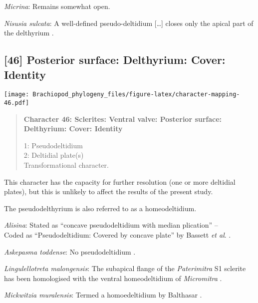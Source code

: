 \documentclass[openany]{book}
\theoremstyle{definition}
\theoremstyle{definition}
\theoremstyle{definition}
\theoremstyle{remark}
\begin{document}
\hypertarget{Micrina-coding-45}{}
\emph{Micrina}: Remains somewhat open.

\hypertarget{Nisusia_sulcata-coding-45}{}
\emph{Nisusia sulcata}: A well-defined pseudo-deltidium {[}\ldots{}{]}
closes only the apical part of\\
the delthyrium \citep{Rowell1985Theevolutionary}.

\subsection*{{[}46{]} Posterior surface: Delthyrium: Cover:
Identity}\label{posterior-surface-delthyrium-cover-identity}

\texttt{[image: Brachiopod\_phylogeny\_files/figure-latex/character-mapping-46.pdf]}

\begin{quote}
\textbf{Character 46: Sclerites: Ventral valve: Posterior surface:
Delthyrium: Cover: Identity}

1: Pseudodeltidium\\
2: Deltidial plate(s)\\
Transformational character.
\end{quote}

This character has the capacity for further resolution (one or more
deltidial plates), but this is unlikely to affect the results of the
present study.

The pseudodelthyrium is also referred to as a homeodeltidium.

\hypertarget{Alisina-coding-46}{}
\emph{Alisina}: Stated as ``concave pseudodeltidium with median
plication'' -- \citet{Williams2000LinguliformeaCraniiformea}\\
Coded as ``Pseudodeltidium: Covered by concave plate'' by Bassett
\emph{et al}. \citeyearpar{Bassett2001Functionalmorphology}.

\hypertarget{Askepasma_toddense-coding-46}{}
\emph{Askepasma toddense}: No pseudodeltidium
\citep[p.~153]{Williams2000LinguliformeaCraniiformea}.

\hypertarget{Lingulellotreta_malongensis-coding-46}{}
\emph{Lingulellotreta malongensis}: The subapical flange of the
\emph{Paterimitra} S1 sclerite has been homologised with the ventral
homeodeltidium of \emph{Micromitra} \citep{Larsson2014iPaterimitra}.

\hypertarget{Mickwitzia_muralensis-coding-46}{}
\emph{Mickwitzia muralensis}: Termed a homoedeltidium by Balthasar
\citeyearpar{Balthasar2004Shellstructure}.
\end{document}
